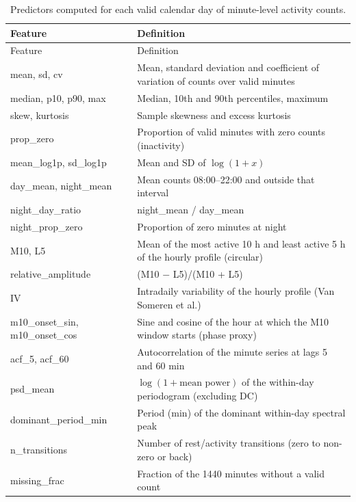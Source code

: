\begin{longtable}{p{3.2cm}p{10.8cm}}
\caption{Predictors computed for each valid calendar day of minute-level activity counts.}\label{tab:features}\\
\toprule Feature & Definition\\ \midrule \endfirsthead
\toprule Feature & Definition\\ \midrule \endhead
mean, sd, cv & Mean, standard deviation and coefficient of variation of counts over valid minutes\\
median, p10, p90, max & Median, 10th and 90th percentiles, maximum\\
skew, kurtosis & Sample skewness and excess kurtosis\\
prop\_zero & Proportion of valid minutes with zero counts (inactivity)\\
mean\_log1p, sd\_log1p & Mean and SD of $\log(1+x)$\\
day\_mean, night\_mean & Mean counts 08:00--22:00 and outside that interval\\
night\_day\_ratio & night\_mean / day\_mean\\
night\_prop\_zero & Proportion of zero minutes at night\\
M10, L5 & Mean of the most active 10 h and least active 5 h of the hourly profile (circular)\\
relative\_amplitude & (M10 $-$ L5)/(M10 + L5)\\
IV & Intradaily variability of the hourly profile (Van Someren et al.)\\
m10\_onset\_sin, m10\_onset\_cos & Sine and cosine of the hour at which the M10 window starts (phase proxy)\\
acf\_5, acf\_60 & Autocorrelation of the minute series at lags 5 and 60 min\\
psd\_mean & $\log(1+\text{mean power})$ of the within-day periodogram (excluding DC)\\
dominant\_period\_min & Period (min) of the dominant within-day spectral peak\\
n\_transitions & Number of rest/activity transitions (zero to non-zero or back)\\
missing\_frac & Fraction of the 1440 minutes without a valid count\\
\bottomrule
\end{longtable}
